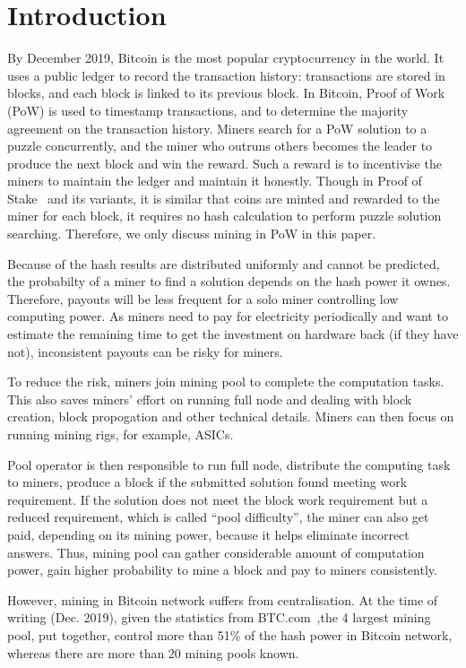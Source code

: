 \section{Introduction}
\label{sec:intro}

By December 2019, Bitcoin is the most popular cryptocurrency in the world.
It uses a public ledger to record the transaction history: transactions are stored in blocks, and each block is linked to its previous block.
In Bitcoin, Proof of Work (PoW) is used to timestamp transactions, and to determine the majority agreement on the transaction history.
Miners search for a PoW solution to a puzzle concurrently, and the miner who outruns others becomes the leader to produce the next block and win the reward.
Such a reward is to incentivise the miners to maintain the ledger and maintain it honestly.
Though in Proof of Stake~\cite{} and its variants, it is similar that coins are minted and rewarded to the miner for each block, it requires no hash calculation to perform puzzle solution searching.
Therefore, we only discuss mining in PoW in this paper.

Because of the hash results are distributed uniformly and cannot be predicted, the probabilty of a miner to find a solution depends on the hash power it ownes.
Therefore, payouts will be less frequent for a solo miner controlling low computing power.
As miners need to pay for electricity periodically and want to estimate the remaining time to get the investment on hardware back (if they have not), inconsistent payouts can be risky for miners.

To reduce the risk, miners join mining pool to complete the computation tasks.
This also saves miners' effort on running full node and dealing with block creation, block propogation and other technical details.
Miners can then focus on running mining rigs, for example, ASICs.

Pool operator is then responsible to run full node, distribute the computing task to miners, 
produce a block if the submitted solution found meeting work requirement.
If the solution does not meet the block work requirement but a reduced requirement, which is called ``pool difficulty'', the miner can also get paid, depending on its mining power, because it helps eliminate incorrect answers.
Thus, mining pool can gather considerable amount of computation power, gain higher probability to mine a block and pay to miners consistently.

However, mining in Bitcoin network suffers from centralisation.
At the time of writing (Dec. 2019), given the statistics from BTC.com~\cite{btc-com},the 4 largest mining pool, put together, control more than 51\% of the hash power in Bitcoin network, whereas there are more than 20 mining pools known.

